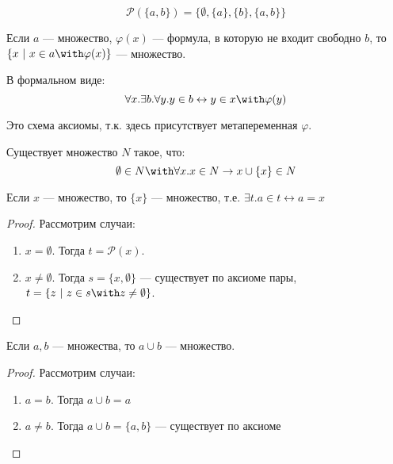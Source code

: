 \begin{example}
    \[\mathcal{P}(\{a, b\}) = \{\emptyset, \{a\}, \{b\}, \{a, b\}\}\]
\end{example}

\begin{axiom}
    Если \(a\) --- множество, \(\varphi(x)\) --- формула, в которую не входит свободно \(b\), то \(\{x\ |\ x \in a \with \varphi(x)\}\) --- множество.

    В формальном виде:
    \[\forall x.\exists b.\forall y.y \in b \leftrightarrow y \in x \with \varphi(y)\]

    \begin{remark}
        Это схема аксиомы, т.к. здесь присутствует метапеременная \(\varphi\).
    \end{remark}
\end{axiom}

\begin{axiom}[бесконечности]
    Существует множество \(N\) такое, что:
    \[\emptyset \in N \with \forall x.x \in N \to x \cup \{x\} \in N\]
\end{axiom}

\begin{theorem}
    \label{множество x}
    Если \(x\) --- множество, то \(\{x\}\) --- множество, т.е. \(\exists t.a \in t \leftrightarrow a = x\)
\end{theorem}
\begin{proof}
    Рассмотрим случаи:
    \begin{enumerate}
        \item \(x = \emptyset\). Тогда \(t = \mathcal{P}(x)\).
        \item \(x \neq \emptyset\). Тогда \(s = \{x, \emptyset\}\) --- существует по аксиоме пары, \(t = \{z\ |\ z \in s \with z \neq \emptyset\}\).
    \end{enumerate}
\end{proof}

\begin{theorem}
    Если \(a, b\) --- множества, то \(a \cup b\) --- множество.
\end{theorem}

\begin{proof}
    Рассмотрим случаи:
    \begin{enumerate}
        \item \(a = b\). Тогда \(a \cup b = a\)
        \item \(a \neq b\). Тогда \(a \cup b = \{a, b\}\) --- существует по аксиоме 
    \end{enumerate}
\end{proof}

